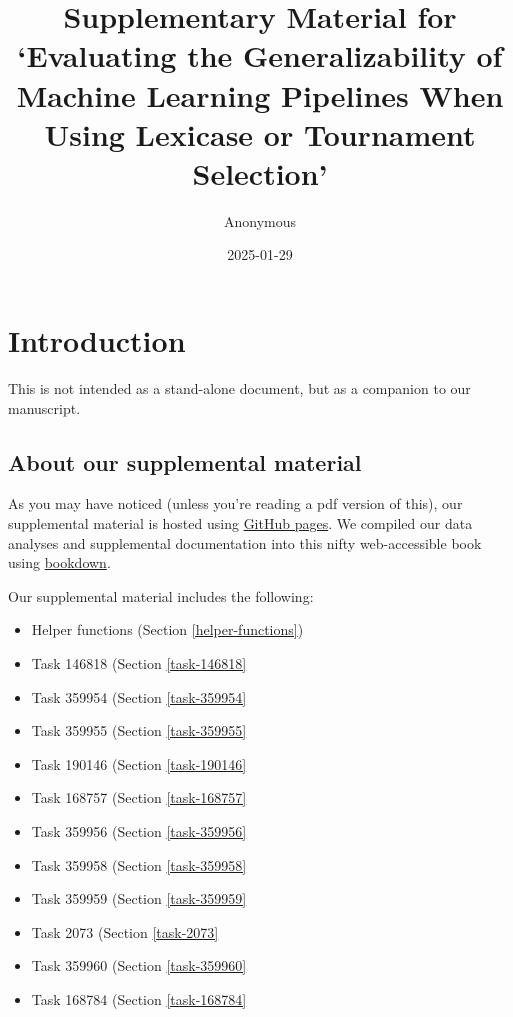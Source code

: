 \documentclass[
]{book}
\title{Supplementary Material for `Evaluating the Generalizability of Machine Learning Pipelines When Using Lexicase or Tournament Selection'}
\author{Anonymous}
\date{2025-01-29}
\providecommand{\tightlist}{%
  \setlength{\itemsep}{0pt}\setlength{\parskip}{0pt}}
\begin{document}
\maketitle

{
\setcounter{tocdepth}{1}
\tableofcontents
}
\hypertarget{introduction}{%
\chapter{Introduction}\label{introduction}}

This is not intended as a stand-alone document, but as a companion to our manuscript.

\hypertarget{about-our-supplemental-material}{%
\section{About our supplemental material}\label{about-our-supplemental-material}}

As you may have noticed (unless you're reading a pdf version of this), our supplemental material is hosted using \href{https://pages.github.com/}{GitHub pages}.
We compiled our data analyses and supplemental documentation into this nifty web-accessible book using \href{https://bookdown.org}{bookdown}.

Our supplemental material includes the following:

\begin{itemize}
\tightlist
\item
  Helper functions (Section \ref{helper-functions})
\item
  Task 146818 (Section \ref{task-146818}
\item
  Task 359954 (Section \ref{task-359954}
\item
  Task 359955 (Section \ref{task-359955}
\item
  Task 190146 (Section \ref{task-190146}
\item
  Task 168757 (Section \ref{task-168757}
\item
  Task 359956 (Section \ref{task-359956}
\item
  Task 359958 (Section \ref{task-359958}
\item
  Task 359959 (Section \ref{task-359959}
\item
  Task 2073 (Section \ref{task-2073}
\item
  Task 359960 (Section \ref{task-359960}
\item
  Task 168784 (Section \ref{task-168784}
\end{itemize}
\end{document}
